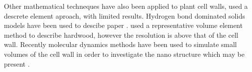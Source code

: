 Other mathematical techneques have also been applied to plant cell walls, \cite{HEPWORTH_1998} used a descrete element aproach, with limited results. Hydrogen bond dominated solids models have been used to descibe paper \cite{nissan1997link}\cite{batten1987unified}\cite{nissan1987unified}\cite{batten1987unified}. \cite{Zhan_2014} used a representative volume element method to describe hardwood, however the resolution is above that of the cell wall. Recently molecular dynamics methods have been used to simulate small volumes of
the cell wall in order to investigate the nano structure which may be present \cite{Charlier_2012}\cite{Zhang_2009}\cite{Sangha_2011}\cite{houtman1995cellulose}.
